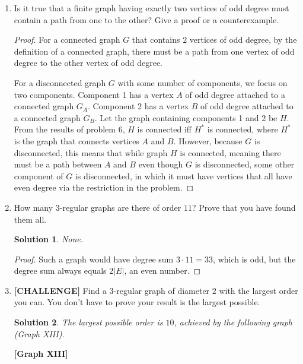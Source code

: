 \documentclass[11pt]{article}
\theoremstyle{solstyle}
\newtheorem*{solution}{Solution}
\newcommand{\glabel}[1]{\begin{center}\textbf{[Graph #1]}\end{center}}
\begin{document}
\begin{enumerate}[leftmargin=*]
\item Is it true that a finite graph having exactly two vertices of odd degree must contain a path from one to the other? Give a proof or a counterexample.

\begin{proof}  
For a connected graph $G$ that contains $2$ vertices of odd degree, by the definition of a connected graph, there must be a path from one vertex of odd degree to the other vertex of odd degree.

For a disconnected graph $G$ with some number of components, we focus on two components. Component 1 has a vertex $A$ of odd degree attached to a connected graph $G_A$. Component 2 has a vertex $B$ of odd degree attached to a connected graph $G_B$. Let the graph containing components 1 and 2 be $H$. From the results of problem 6, $H$ is connected iff $H^{*}$ is connected, where $H^{*}$ is the graph that connects vertices $A$ and $B$. However, because $G$ is disconnected, this means that while graph $H$ is connected, meaning there must be a path between $A$ and $B$ even though $G$ is disconnected, some other component of $G$ is disconnected, in which it must have vertices that all have even degree via the restriction in the problem.
\end{proof}

\item How many $3$-regular graphs are there of order $11$? Prove that you have found them all.
\begin{solution}
None. 
\end{solution}
\begin{proof}
Such a graph would have degree sum $3\cdot 11=33$, which is odd, but the degree sum always equals $2\lvert E\rvert$, an even number.
\end{proof}

\item \textbf{[CHALLENGE]} Find a $3$-regular graph of diameter $2$ with the largest order you can. You don't have to prove your result is the largest possible.

\begin{solution}
The largest possible order is $10$, achieved by the following graph (Graph XIII).
\end{solution}

\begin{center}
\end{center}
\glabel{XIII}


\end{enumerate}
\end{document}
